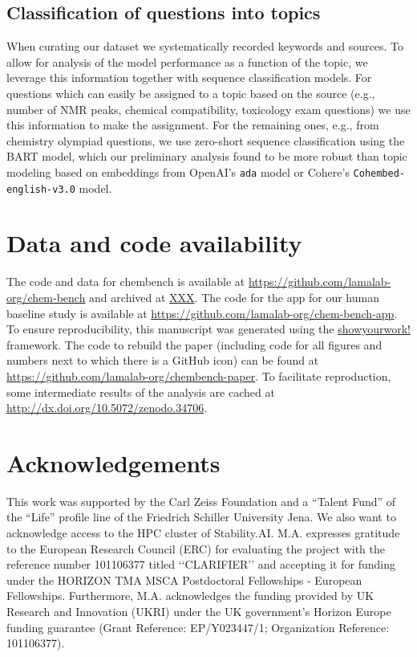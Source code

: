 \documentclass[11pt, oneside]{article}
\begin{document}
\subsection{Classification of questions into topics}\label{sec:meth-topic} When curating our dataset we systematically recorded keywords and sources.
To allow for analysis of the model performance as a function of the topic, we leverage this information together with sequence classification models.
For questions which can easily be assigned to a topic based on the source (e.g., number of NMR peaks, chemical compatibility, toxicology exam questions) we use this information to make the assignment.
For the remaining ones, e.g., from chemistry olympiad questions, we use zero-short sequence classification\cite{zeroshotsequence} using the BART model\cite{bart, FacebookBART}, which our preliminary analysis found to be more robust than topic modeling based on embeddings from OpenAI's \texttt{ada} model or Cohere's \texttt{Cohembed-english-v3.0} model.


\section*{Data and code availability}
The code and data for chembench is available at \url{https://github.com/lamalab-org/chem-bench} and archived at \url{XXX}.
The code for the app for our human baseline study is available at \url{https://github.com/lamalab-org/chem-bench-app}. 
To ensure reproducibility, this manuscript was generated using the \href{https://show-your.work/en/latest/}{showyourwork!} framework.\cite{Luger2021}
The code to rebuild the paper (including code for all figures and numbers next to which there is a GitHub icon) can be found at \url{https://github.com/lamalab-org/chembench-paper}. 
To facilitate reproduction, some intermediate results of the analysis are cached at \url{http://dx.doi.org/10.5072/zenodo.34706}.

\section*{Acknowledgements}
This work was supported by the Carl Zeiss Foundation and a \enquote{Talent Fund} of the \enquote{Life} profile line of the Friedrich Schiller University Jena.
We also want to acknowledge access to the HPC cluster of Stability.AI.
M.A. expresses gratitude to the European Research Council (ERC) for evaluating the project with the reference number 101106377 titled ‘‘CLARIFIER’’ and accepting it for funding under the HORIZON TMA MSCA Postdoctoral Fellowships - European Fellowships. 
Furthermore, M.A. acknowledges the funding provided by UK Research and Innovation (UKRI) under the UK government’s Horizon Europe funding guarantee (Grant Reference: EP/Y023447/1; Organization Reference: 101106377).
\end{document}
